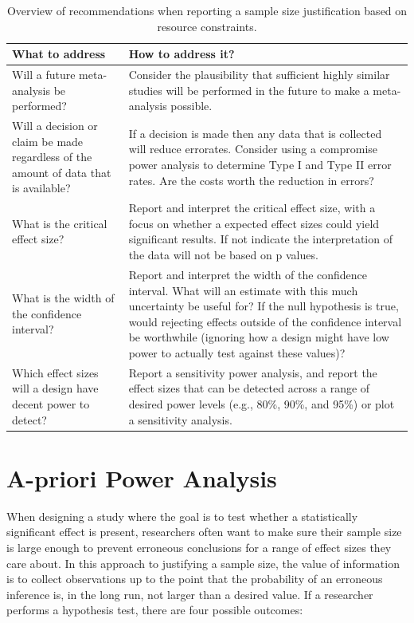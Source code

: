 \documentclass[
  oneside]{krantz}
\begin{document}
\begin{table}

\caption{\label{tab:table-pow-rec}Overview of recommendations when reporting a sample size justification based on resource constraints.}
\centering
\begin{tabular}[t]{>{\raggedright\arraybackslash}p{5cm}|>{\raggedright\arraybackslash}p{10cm}}
\hline
What to address & How to address it?\\
\hline
Will a future meta-analysis be performed? & Consider the plausibility that sufficient highly similar studies will be performed in the future to make a meta-analysis possible.\\
\hline
Will a decision or claim be made regardless of the amount of data that is available? & If a decision is made then any data that is collected will reduce errorates. Consider using a compromise power analysis to determine Type I and Type II error rates. Are the costs worth the reduction in errors?\\
\hline
What is the critical effect size? & Report and interpret the critical effect size, with a focus on whether a expected effect sizes could yield significant results. If not indicate the interpretation of the data will not be based on p values.\\
\hline
What is the width of the confidence interval? & Report and interpret the width of the confidence interval. What will an estimate with this much uncertainty be useful for? If the null hypothesis is true, would rejecting effects outside of the confidence interval be worthwhile (ignoring how a design might have low power to actually test against these values)?\\
\hline
Which effect sizes will a design have decent power to detect? & Report a sensitivity power analysis, and report the effect sizes that can be detected across a range of desired power levels (e.g., 80\%, 90\%, and 95\%) or plot a sensitivity analysis.\\
\hline
\end{tabular}
\end{table}

\hypertarget{aprioripower}{%
\section{A-priori Power Analysis}\label{aprioripower}}

When designing a study where the goal is to test whether a statistically significant effect is present, researchers often want to make sure their sample size is large enough to prevent erroneous conclusions for a range of effect sizes they care about. In this approach to justifying a sample size, the value of information is to collect observations up to the point that the probability of an erroneous inference is, in the long run, not larger than a desired value. If a researcher performs a hypothesis test, there are four possible outcomes:
\end{document}
